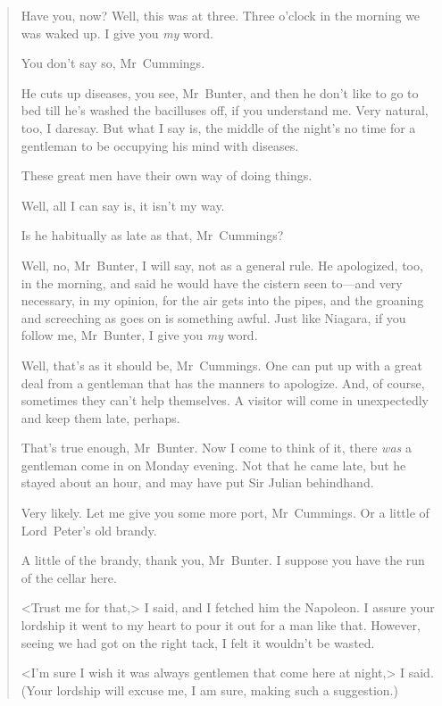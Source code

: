 \begin{quotation}
\begin{dialogue}
 Have you, now? Well, this was at three. Three o'clock in the morning we was waked up. I give you \textit{my} word.

 You don't say so, Mr~Cummings.

 He cuts up diseases, you see, Mr~Bunter, and then he don't like to go to bed till he's washed the bacilluses off, if you understand me. Very natural, too, I daresay. But what I say is, the middle of the night's no time for a gentleman to be occupying his mind with diseases.

 These great men have their own way of doing things.

 Well, all I can say is, it isn't my way.


 Is he habitually as late as that, Mr~Cummings?

 Well, no, Mr~Bunter, I will say, not as a general rule. He apologized, too, in the morning, and said he would have the cistern seen to—and very necessary, in my opinion, for the air gets into the pipes, and the groaning and screeching as goes on is something awful. Just like Niagara, if you follow me, Mr~Bunter, I give you \textit{my} word.

 Well, that's as it should be, Mr~Cummings. One can put up with a great deal from a gentleman that has the manners to apologize. And, of course, sometimes they can't help themselves. A visitor will come in unexpectedly and keep them late, perhaps.

 That's true enough, Mr~Bunter. Now I come to think of it, there \textit{was} a gentleman come in on Monday evening. Not that he came late, but he stayed about an hour, and may have put Sir Julian behindhand.

 Very likely. Let me give you some more port, Mr~Cummings. Or a little of Lord~Peter's old brandy.

 A little of the brandy, thank you, Mr~Bunter. I suppose you have the run of the cellar here. 
\end{dialogue}

<Trust me for that,> I said, and I fetched him the Napoleon. I assure your lordship it went to my heart to pour it out for a man like that. However, seeing we had got on the right tack, I felt it wouldn't be wasted.

<I'm sure I wish it was always gentlemen that come here at night,> I said. (Your lordship will excuse me, I am sure, making such a suggestion.)
\end{quotation}

